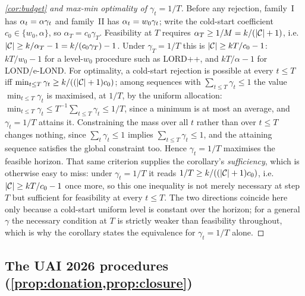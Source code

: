 \begin{proof}[\cref{cor:budget} and max-min optimality of $\gamma_t=1/T$]
Before any rejection, family~I has $\alpha_t=\alpha\gamma_t$ and family~II has $\alpha_t=w_0\gamma_t$;
write the cold-start coefficient $c_0\in\{w_0,\alpha\}$, so $\alpha_T=c_0\gamma_T$. Feasibility at $T$
requires $\alpha_T\ge 1/M=k/(\lvert\mathcal{C}\rvert+1)$, i.e. $\lvert\mathcal{C}\rvert\ge k/\alpha_T-1=k/(c_0\gamma_T)-1$. Under
$\gamma_T=1/T$ this is $\lvert\mathcal{C}\rvert\ge kT/c_0-1$: $kT/w_0-1$ for a level-$w_0$ procedure such as LORD++,
and $kT/\alpha-1$ for LOND/e-LOND. For optimality, a cold-start rejection is possible at every
$t\le T$ iff $\min_{t\le T}\gamma_t \ge k/((\lvert\mathcal{C}\rvert+1)c_0)$; among sequences with
$\sum_{t\le T}\gamma_t\le 1$ the value $\min_{t\le T}\gamma_t$ is maximised, at $1/T$, by the
uniform allocation: $\min_{t\le T}\gamma_t\le T^{-1}\sum_{t\le T}\gamma_t\le1/T$, since a minimum is
at most an average, and $\gamma_t=1/T$ attains it. Constraining the mass over all $t$ rather than over
$t\le T$ changes nothing, since $\sum_t\gamma_t\le1$ implies $\sum_{t\le T}\gamma_t\le1$, and the
attaining sequence satisfies the global constraint too. Hence $\gamma_t=1/T$ maximises the feasible
horizon. That same criterion supplies the corollary's \emph{sufficiency}, which is otherwise easy to
miss: under $\gamma_t=1/T$ it reads $1/T\ge k/((\lvert\mathcal{C}\rvert+1)c_0)$, i.e.\ $\lvert\mathcal{C}\rvert\ge kT/c_0-1$ once more, so
this one inequality is not merely necessary at step $T$ but sufficient for feasibility at every
$t\le T$. The two directions coincide here only because a cold-start uniform level is constant over
the horizon; for a general $\gamma$ the necessary condition at $T$ is strictly weaker than
feasibility throughout, which is why the corollary states the equivalence for $\gamma_t=1/T$ alone.
\end{proof}

\subsection{The UAI 2026 procedures (\cref{prop:donation,prop:closure})}

